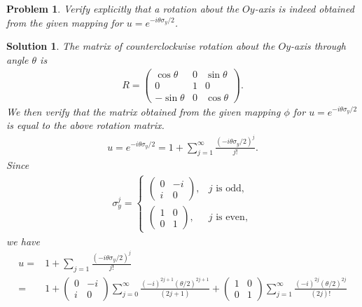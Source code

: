 \documentclass[UTF8,10pt,a4paper]{article}
\theoremstyle{Problem}
\newtheorem{prob}{Problem}
\theoremstyle{Solution}
\newtheorem*{sol}{Solution}
\begin{document}
\begin{prob}
    Verify explicitly that a rotation about the $Oy$-axis is indeed obtained from the given mapping for $u=e^{-i\theta\sigma_y/2}$.
\end{prob}
\begin{sol}
    The matrix of counterclockwise rotation about the $Oy$-axis through angle $\theta$ is
    \begin{align}
        R=\left(\begin{matrix}
            \cos\theta&0&\sin\theta\\
            0&1&0\\
            -\sin\theta&0&\cos\theta
        \end{matrix}\right).
    \end{align}
    We then verify that the matrix obtained from the given mapping $\phi$ for $u=e^{-i\theta\sigma_y/2}$ is equal to the above rotation matrix.
    \begin{align}
        u=e^{-i\theta\sigma_y/2}=1+\sum_{j=1}^{\infty}\frac{(-i\theta\sigma_y/2)^j}{j!}.
    \end{align}
    Since
    \begin{align}
        \sigma_y^j=\left\{\begin{array}{ll}
            \left(\begin{matrix}
                0&-i\\
                i&0
            \end{matrix}\right),&j\text{ is odd},\\
            \left(\begin{matrix}
                1&0\\
                0&1
            \end{matrix}\right),&j\text{ is even},
        \end{array}\right.
    \end{align}
    we have
    \begin{align}
        \nonumber u=&1+\sum_{j=1}\frac{(-i\theta\sigma_y/2)^j}{j!}\\
        \nonumber=&1+\left(\begin{matrix}
            0&-i\\
            i&0
        \end{matrix}\right)\sum_{j=0}^{\infty}\frac{(-i)^{2j+1}(\theta/2)^{2j+1}}{(2j+1)}+\left(\begin{matrix}
            1&0\\
            0&1
        \end{matrix}\right)\sum_{j=1}^{\infty}\frac{(-i)^{2j}(\theta/2)^{2j}}{(2j)!}\\

\end{align}
\end{sol}
\end{document}
